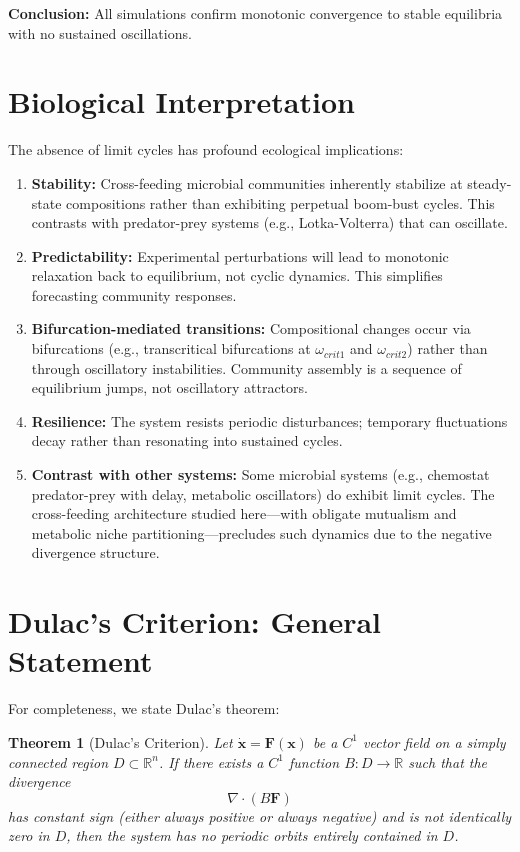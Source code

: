 \documentclass[11pt]{article}
\newtheorem{theorem}{Theorem}
\begin{document}
\textbf{Conclusion:} All simulations confirm monotonic convergence to stable equilibria with no sustained oscillations.

\section{Biological Interpretation}

The absence of limit cycles has profound ecological implications:

\begin{enumerate}
    \item \textbf{Stability:} Cross-feeding microbial communities inherently stabilize at steady-state compositions rather than exhibiting perpetual boom-bust cycles. This contrasts with predator-prey systems (e.g., Lotka-Volterra) that can oscillate.

    \item \textbf{Predictability:} Experimental perturbations will lead to monotonic relaxation back to equilibrium, not cyclic dynamics. This simplifies forecasting community responses.

    \item \textbf{Bifurcation-mediated transitions:} Compositional changes occur via bifurcations (e.g., transcritical bifurcations at $\omega_{crit1}$ and $\omega_{crit2}$) rather than through oscillatory instabilities. Community assembly is a sequence of equilibrium jumps, not oscillatory attractors.

    \item \textbf{Resilience:} The system resists periodic disturbances; temporary fluctuations decay rather than resonating into sustained cycles.

    \item \textbf{Contrast with other systems:} Some microbial systems (e.g., chemostat predator-prey with delay, metabolic oscillators) do exhibit limit cycles. The cross-feeding architecture studied here—with obligate mutualism and metabolic niche partitioning—precludes such dynamics due to the negative divergence structure.
\end{enumerate}

\section{Dulac's Criterion: General Statement}

For completeness, we state Dulac's theorem:

\begin{theorem}[Dulac's Criterion]
Let $\dot{\mathbf{x}} = \mathbf{F}(\mathbf{x})$ be a $C^1$ vector field on a simply connected region $D \subset \mathbb{R}^n$. If there exists a $C^1$ function $B: D \to \mathbb{R}$ such that the divergence
\begin{equation}
\nabla \cdot (B \mathbf{F})
\end{equation}
has constant sign (either always positive or always negative) and is not identically zero in $D$, then the system has no periodic orbits entirely contained in $D$.
\end{theorem}
\end{document}
